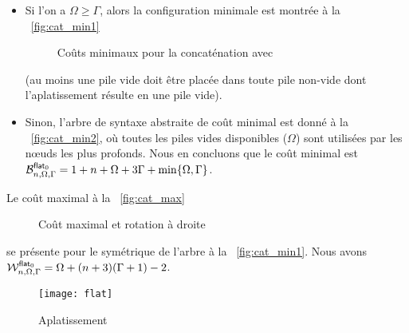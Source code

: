 \begin{itemize}

  \item Si l'on a \(\Omega \geqslant \Gamma\), alors la configuration
    minimale est montrée à la \fig~\ref{fig:cat_min1}
\begin{figure}
\centering
{}
\quad
{}
\caption{Coûts minimaux pour la concaténation avec }
\label{fig:cat_min}
\end{figure}
(au moins une pile vide doit être placée dans toute pile non-vide dont
l'aplatissement résulte en une pile vide).

\item Sinon, l'arbre de syntaxe abstraite de coût minimal est donné à
  la \fig~\ref{fig:cat_min2}, où toutes les piles vides disponibles
  (\(\Omega\)) sont utilisées par les nœuds  les plus
  profonds. Nous en concluons que le coût
  minimal est
  \(\B{\fun{flat}_0}{n,\Omega,\Gamma} = 1 + n + \Omega + 3\Gamma +
  \min\{\Omega,\Gamma\}\).

\end{itemize}
Le coût maximal à la
\fig~\ref{fig:cat_max}
\begin{figure}
\centering
{}
\qquad
{}
\qquad
{}
\caption{Coût maximal et rotation à droite}
\end{figure}
se présente pour le symétrique de l'arbre à la
\fig~\ref{fig:cat_min1}. Nous
avons
\(\W{\fun{flat}_0}{n,\Omega,\Gamma} = \Omega + (n+3)(\Gamma+1) - 2\).

%
\begin{wrapfigure}[7]{r}[0pt]{0pt}
\centering
\texttt{[image: flat]}%
\caption{Aplatissement}
\label{fig:flat}
\end{wrapfigure}

